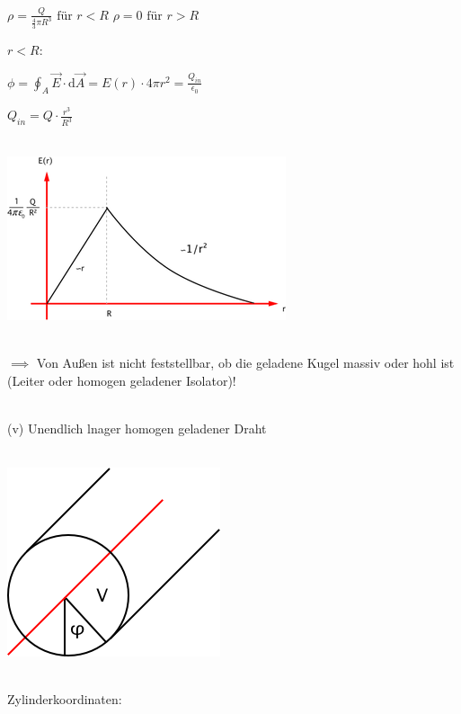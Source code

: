 \documentclass[11pt]{article}
\begin{document}
\hfill\\

$ \rho =\frac{Q}{\frac{4}{3}\pi R^3} \text{ für }r<R $
$ \rho=0 \text{ für }r>R$

\underline{$r<R$}:

$ \phi=\oint_{A}\vec{E}\cdot\mathrm{d}\vec{A} = E(r)\cdot4\pi r^2=\frac{Q_{in}}{\epsilon_0}$

$ Q_{in} = Q\cdot\frac{r^3}{R^3} $


\hfill\\

\includegraphics{skizzen/14/14_6B7}

\hfill\\

$\implies$ Von Außen ist nicht feststellbar, ob die geladene Kugel massiv oder hohl ist (Leiter oder homogen geladener Isolator)!

\hfill\\

(v) Unendlich lnager homogen geladener Draht

\hfill\\

\includegraphics{skizzen/14/14_6B8}

\hfill\\

Zylinderkoordinaten:

\hfill\\
\end{document}
